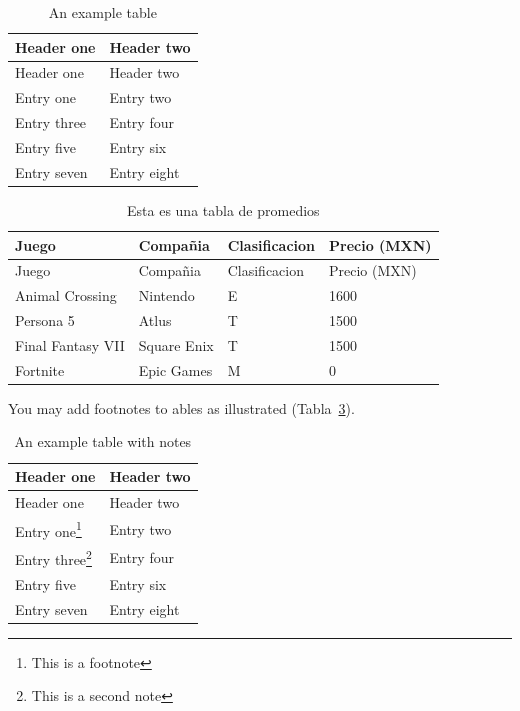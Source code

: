 \documentclass[
  12pt,
  letterpaper,
  DIV=11,
  numbers=noendperiod,
  oneside]{scrreport}
\begin{document}
\begin{longtable}[]{@{}ll@{}}
\caption{An example table}\label{tbl-example}\tabularnewline
\toprule\noalign{}
Header one & Header two \\
\midrule\noalign{}
\endfirsthead
\toprule\noalign{}
Header one & Header two \\
\midrule\noalign{}
\endhead
\bottomrule\noalign{}
\endlastfoot
Entry one & Entry two \\
Entry three & Entry four \\
Entry five & Entry six \\
Entry seven & Entry eight \\
\end{longtable}

\begin{longtable}[]{@{}llll@{}}
\caption{Esta es una tabla de
promedios}\label{tbl-los_promedios}\tabularnewline
\toprule\noalign{}
Juego & Compañia & Clasificacion & Precio (MXN) \\
\midrule\noalign{}
\endfirsthead
\toprule\noalign{}
Juego & Compañia & Clasificacion & Precio (MXN) \\
\midrule\noalign{}
\endhead
\bottomrule\noalign{}
\endlastfoot
Animal Crossing & Nintendo & E & 1600 \\
Persona 5 & Atlus & T & 1500 \\
Final Fantasy VII & Square Enix & T & 1500 \\
Fortnite & Epic Games & M & 0 \\
\end{longtable}

You may add footnotes to ables as illustrated (Tabla~\ref{tbl-notes}).

\begin{longtable}[]{@{}ll@{}}
\caption{An example table with notes}\label{tbl-notes}\tabularnewline
\toprule\noalign{}
Header one & Header two \\
\midrule\noalign{}
\endfirsthead
\toprule\noalign{}
Header one & Header two \\
\midrule\noalign{}
\endhead
\bottomrule\noalign{}
\endlastfoot
Entry one\footnote{This is a footnote} & Entry two \\
Entry three\footnote{This is a second note} & Entry four \\
Entry five & Entry six \\
Entry seven & Entry eight \\
\end{longtable}
\end{document}
